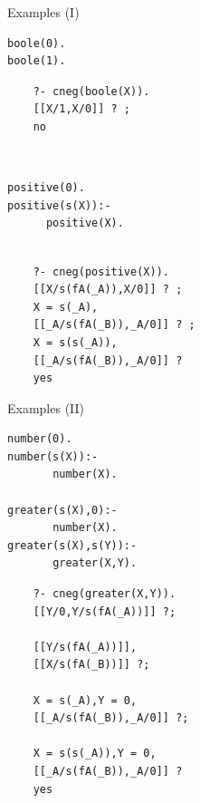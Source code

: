 \documentclass[pdf,slideColor,contemporain]{prosper}
\begin{document}
\begin{slide}{Examples (I)}
\begin{small}

 \begin{minipage}{1.6in}
\begin{verbatim}
boole(0).
boole(1).
\end{verbatim}
\end{minipage}
\begin{minipage}{2in}
{\blue
\begin{verbatim} 
    ?- cneg(boole(X)).
    [[X/1,X/0]] ? ;
    no
\end{verbatim} 
}%
\end{minipage}\\
\vspace{0.5cm}
\begin{minipage}{1.6in}
\begin{verbatim}
positive(0). 
positive(s(X)):-
      positive(X).  
\end{verbatim}
\end{minipage}
\begin{minipage}{2in}
{\blue
\begin{verbatim} 

    ?- cneg(positive(X)).
    [[X/s(fA(_A)),X/0]] ? ;
    X = s(_A),
    [[_A/s(fA(_B)),_A/0]] ? ;
    X = s(s(_A)),
    [[_A/s(fA(_B)),_A/0]] ? 
    yes
\end{verbatim} 
}%
\end{minipage}

\end{small}

\end{slide}


\begin{slide}{Examples (II)}
\vspace{-0.3cm}
\begin{small}
\begin{minipage}{1.7in}
\begin{verbatim}
number(0).
number(s(X)):-
       number(X).

greater(s(X),0):-
       number(X).
greater(s(X),s(Y)):-
       greater(X,Y).
\end{verbatim}
\end{minipage}
\begin{minipage}{2in}
{\blue
\begin{verbatim} 
    ?- cneg(greater(X,Y)).
    [[Y/0,Y/s(fA(_A))]] ?;

    [[Y/s(fA(_A))]],
    [[X/s(fA(_B))]] ?;

    X = s(_A),Y = 0,
    [[_A/s(fA(_B)),_A/0]] ?;

    X = s(s(_A)),Y = 0,
    [[_A/s(fA(_B)),_A/0]] ? 
    yes
\end{verbatim} 
}%
\end{minipage}

\end{small}

\end{slide}
\end{document}
